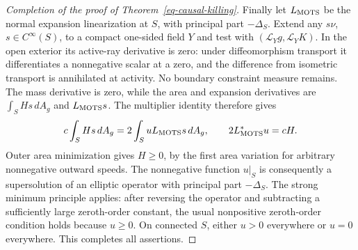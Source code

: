 \begin{proof}[Completion of the proof of Theorem~\ref{eq-causal-killing}]
Finally let \(L_{\rm MOTS}\) be the normal expansion linearization
at \(S\), with principal part \(-\Delta_S\).  Extend any
\(s\nu\), \(s\in C^\infty(S)\), to a compact one-sided field \(Y\)
and test with \((\mathcal L_Yg,\mathcal L_YK)\).
In the open exterior its active-ray derivative is zero: under
diffeomorphism transport it differentiates a nonnegative scalar at
a zero, and the difference from isometric transport is annihilated
at activity.  No boundary constraint measure remains.
The mass derivative is zero, while the area and expansion derivatives
are \(\int_SHs\,dA_g\) and \(L_{\rm MOTS}s\).
The multiplier identity therefore gives
\[
 c\int_SHs\,dA_g=2\int_SuL_{\rm MOTS}s\,dA_g,\qquad
 2L_{\rm MOTS}^*u=cH.
\]
Outer area minimization gives \(H\geq0\), by the first area
variation for arbitrary nonnegative outward speeds.
The nonnegative function \(u|_S\) is consequently a supersolution
of an elliptic operator with principal part \(-\Delta_S\).
The strong minimum principle applies: after reversing the operator
and subtracting a sufficiently large zeroth-order constant, the
usual nonpositive zeroth-order condition holds because \(u\geq0\).
On connected \(S\), either \(u>0\) everywhere or \(u=0\) everywhere.
This completes all assertions.
\end{proof}
